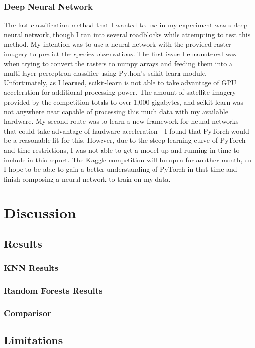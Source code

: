 \documentclass[12pt, oneside]{article}
\begin{document}
\begin{normalsize}
\subsubsection{Deep Neural Network}

The last classification method that I wanted to use in my experiment was a deep neural network, though I ran into several roadblocks while attempting to test this method. My intention was to use a neural network with the provided raster imagery to predict the species observations. The first issue I encountered was when trying to convert the rasters to numpy arrays and feeding them into a multi-layer perceptron classifier using Python's scikit-learn module. Unfortunately, as I learned, scikit-learn is not able to take advantage of GPU acceleration for additional processing power. The amount of satellite imagery provided by the competition totals to over 1,000 gigabytes, and scikit-learn was not anywhere near capable of processing this much data with my available hardware. My second route was to learn a new framework for neural networks that could take advantage of hardware acceleration - I found that PyTorch would be a reasonable fit for this. However, due to the steep learning curve of PyTorch and time-restrictions, I was not able to get a model up and running in time to include in this report. The Kaggle competition will be open for another month, so I hope to be able to gain a better understanding of PyTorch in that time and finish composing a neural network to train on my data. 

\end{normalsize}

\section{Discussion}
\label{Discussion}

\begin{normalsize}

\subsection{Results}

\subsubsection{KNN Results}

\subsubsection{Random Forests Results}

\subsubsection{Comparison}

\subsection{Limitations}

\end{normalsize}
\end{document}
